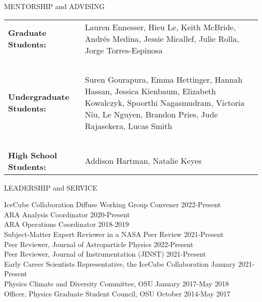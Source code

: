 \documentclass{resume} %
\begin{document}
\begin{rSection}{MENTORSHIP and ADVISING}
\begin{table}[h]
\begin{tabularx}{\textwidth}{l X}
 {\bf Graduate Students:}  & Lauren Ennesser, Hieu Le, Keith McBride, Andr\'es Medina, Jessie Micallef, Julie Rolla,  Jorge Torres-Espinosa \\
 ~ & ~ \\
{\bf Undergraduate Students:}  & Suren Gourapura, Emma Hettinger, Hannah Hassan, Jessica Kienbaum, Elizabeth Kowalczyk, Spoorthi Nagasmudram, Victoria Niu, Le Nguyen, Brandon Pries, Jude Rajasekera, Lucas Smith\\
~ & ~ \\
{\bf High School Students:} &  Addison Hartman, Natalie Keyes\\
\end{tabularx}
\end{table}

\end{rSection}

\begin{rSection}{LEADERSHIP and SERVICE}

IceCube Collaboration Diffuse Working Group Convener \hfill 2022-Present \\
ARA Analysis Coordinator \hfill 2020-Present \\
ARA Operations Coordinator \hfill 2018-2019 \\


Subject-Matter Expert Reviewer in a NASA Peer Review \hfill 2021-Present \\
Peer Reviewer, Journal of Astroparticle Physics \hfill 2022-Present \\
Peer Reviewer, Journal of Instrumentation (JINST) \hfill 2021-Present \\


Early Career Scientists Representative, the IceCube Collaboration \hfill January 2021-Present \\
Physics Climate and Diversity Committee, OSU \hfill January 2017-May 2018\\
Officer, Physics Graduate Student Council, OSU \hfill October 2014-May 2017 \\
\end{rSection}
\newpage
\end{document}
